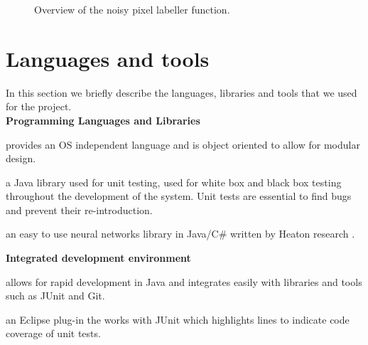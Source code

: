 \documentclass[12pt,twoside,notitlepage]{report}
\begin{document}
\begin{figure}[H]
{\begin{tikzpicture}[node distance=2cm,>=stealth',bend angle=45,auto]
                                    
                            \end{tikzpicture}
                        }

                    \caption{Overview of the noisy pixel labeller function.}
                \end{figure} 







    \section{Languages and tools}
        In this section we briefly describe the languages, libraries and tools that we used for the project. \\

        \noindent\textbf{Programming Languages and Libraries}
            \begin{description}[font=\normalfont\itshape, labelindent=10pt]
                \item[Java:] provides an OS independent language and is object oriented to allow for modular design.
                \item[JUnit:] a Java library used for unit testing, used for white box and black box testing throughout 
                    the development of the system. Unit tests are essential to find bugs and prevent their re-introduction.
                \item[Encog:] an easy to use neural networks library in Java/C\# written by Heaton research \cite{JMLR:v16:heaton15a}. 
            \end{description}

        \noindent\textbf{Integrated development environment}
            \begin{description}[font=\normalfont\itshape, labelindent=10pt]
                \item[Eclipse:] allows for rapid development in Java and integrates easily with libraries and tools such 
                    as JUnit and Git.
                \item[EclEmma:] an Eclipse plug-in the works with JUnit which highlights lines to indicate code coverage 
                    of unit tests.
            \end{description}
\end{document}

